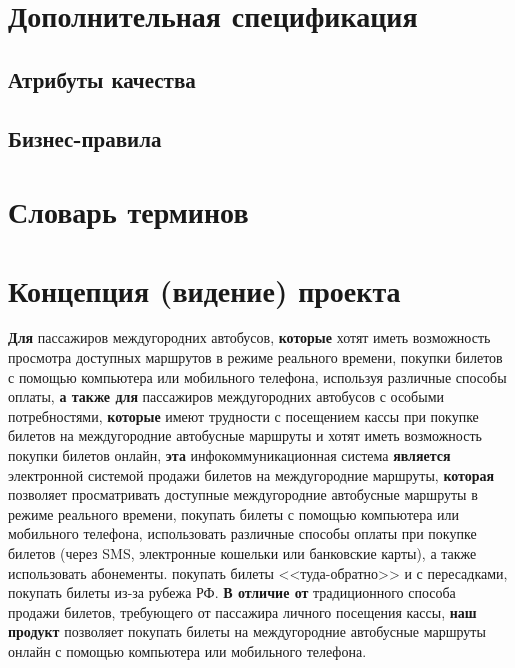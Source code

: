 \section{Дополнительная спецификация}

\subsection{Атрибуты качества}

\subsection{Бизнес-правила}

\section{Словарь терминов}

\section{Концепция (видение) проекта}
\textbf{Для} пассажиров междугородних автобусов,
\textbf{которые} хотят иметь возможность
просмотра доступных маршрутов в режиме реального времени,
покупки билетов с помощью компьютера или мобильного телефона,
используя различные способы оплаты,
\textbf{а также для} пассажиров междугородних автобусов с особыми потребностями,
\textbf{которые} имеют трудности с посещением кассы
при покупке билетов на междугородние автобусные маршруты и хотят иметь
возможность покупки билетов онлайн,
\textbf{эта} инфокоммуникационная система
\textbf{является} электронной системой
продажи билетов на междугородние маршруты,
\textbf{которая} позволяет
просматривать доступные междугородние автобусные
маршруты в режиме реального времени,
покупать билеты с помощью компьютера или мобильного телефона,
использовать различные способы оплаты при покупке билетов (через SMS,
электронные кошельки или банковские карты), а также использовать абонементы.
покупать билеты <<туда-обратно>> и с пересадками,
покупать билеты из-за рубежа РФ.
\textbf{В отличие от} традиционного способа продажи билетов, требующего
от пассажира личного посещения кассы,
\textbf{наш продукт} позволяет покупать билеты на междугородние автобусные
маршруты онлайн с помощью компьютера или мобильного телефона.

